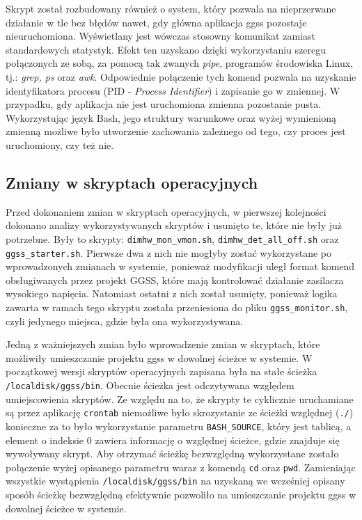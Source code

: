 Skrypt został rozbudowany również o system, który pozwala na nieprzerwane działanie w tle bez błędów nawet, gdy główna aplikacja ggss pozostaje nieuruchomiona. Wyświetlany jest wówczas stosowny komunikat zamiast standardowych statystyk. Efekt ten uzyskano dzięki wykorzystaniu szeregu połączonych ze sobą, za pomocą tak zwanych \emph{pipe}, programów środowiska Linux, tj.: \emph{grep, ps} \cite{man} oraz \emph{awk}. Odpowiednie połączenie tych komend pozwala na uzyskanie identyfikatora procesu (PID - \emph{Process Identifier}) i zapisanie go w zmiennej. W przypadku, gdy aplikacja nie jest uruchomiona zmienna pozostanie pusta. Wykorzystując język Bash, jego struktury warunkowe oraz wyżej wymienioną zmienną możliwe było utworzenie zachowania zależnego od tego, czy proces jest uruchomiony, czy też nie.

\subsection{Zmiany w skryptach operacyjnych}

Przed dokonaniem zmian w skryptach operacyjnych, w pierwszej kolejności dokonano analizy wykorzystywanych skryptów i usunięto te, które nie były już potrzebne. Były to skrypty: \lstinline{dimhw_mon_vmon.sh}, \lstinline{dimhw_det_all_off.sh} oraz \lstinline{ggss_starter.sh}. Pierwsze dwa z nich nie mogłyby zostać wykorzystane po wprowadzonych zmianach w systemie, ponieważ modyfikacji uległ format komend obsługiwanych przez projekt GGSS, które mają kontrolować działanie zasilacza wysokiego napięcia. Natomiast ostatni z nich został usunięty, ponieważ logika zawarta w ramach tego skryptu została przeniesiona do pliku \lstinline{ggss_monitor.sh}, czyli jedynego miejsca, gdzie była ona wykorzystywana.

Jedną z ważniejszych zmian było wprowadzenie zmian w skryptach, które możliwiły umieszczanie projektu ggss w dowolnej ścieżce w systemie. W początkowej wersji skryptów operacyjnych zapisana była na stałe ścieżka \lstinline{/localdisk/ggss/bin}. Obecnie ścieżka jest odczytywana względem umiejscowienia skryptów. Ze względu na to, że skrypty te cyklicznie uruchamiane są przez aplikację \lstinline{crontab} niemożliwe było skrozystanie ze ścieżki względnej (\lstinline{./}) konieczne za to było wykorzystanie parametru \lstinline{BASH_SOURCE}, który jest tablicą, a element o indeksie 0 zawiera informację o względnej ścieżce, gdzie znajduje się wywoływany skrypt. Aby otrzymać ścieżkę bezwzględną wykorzystane zostało połączenie wyżej opisanego parametru waraz z komendą \lstinline{cd} oraz \lstinline{pwd}. Zamieniając wszystkie wystąpienia \lstinline{/localdisk/ggss/bin} na uzyskaną we wcześniej opisany sposób ścieżkę bezwzględną efektywnie pozwoliło na umieszczanie projektu ggss w dowolnej ścieżce w systemie.

